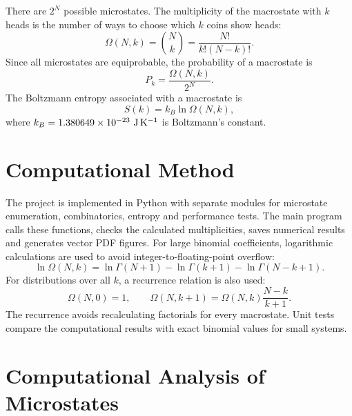 \documentclass[10pt,a4paper]{article}
\begin{document}
There are $2^N$ possible microstates. The multiplicity of the macrostate with $k$ heads is the number of ways to choose which $k$ coins show heads:
\begin{equation}
  \Omega(N,k)=\binom Nk=\frac{N!}{k!(N-k)!}.
  \label{eq:multiplicity}
\end{equation}
Since all microstates are equiprobable, the probability of a macrostate is
\begin{equation}
  P_k=\frac{\Omega(N,k)}{2^N}.
  \label{eq:probability}
\end{equation}
The Boltzmann entropy associated with a macrostate is
\begin{equation}
  S(k)=k_B\ln\Omega(N,k),
  \label{eq:entropy}
\end{equation}
where $k_B=1.380649\times10^{-23}\ {\rm J\,K^{-1}}$ is Boltzmann's constant.

\section{Computational Method}
The project is implemented in Python with separate modules for microstate enumeration, combinatorics, entropy and performance tests. The main program calls these functions, checks the calculated multiplicities, saves numerical results and generates vector PDF figures. For large binomial coefficients, logarithmic calculations are used to avoid integer-to-floating-point overflow:
\begin{equation}
  \ln\Omega(N,k)=\ln\Gamma(N+1)-\ln\Gamma(k+1)-\ln\Gamma(N-k+1).
  \label{eq:log-gamma}
\end{equation}
For distributions over all $k$, a recurrence relation is also used:
\begin{equation}
  \Omega(N,0)=1,\qquad
  \Omega(N,k+1)=\Omega(N,k)\frac{N-k}{k+1}.
  \label{eq:recurrence}
\end{equation}
The recurrence avoids recalculating factorials for every macrostate. Unit tests compare the computational results with exact binomial values for small systems.

\section{Computational Analysis of Microstates}
\end{document}
